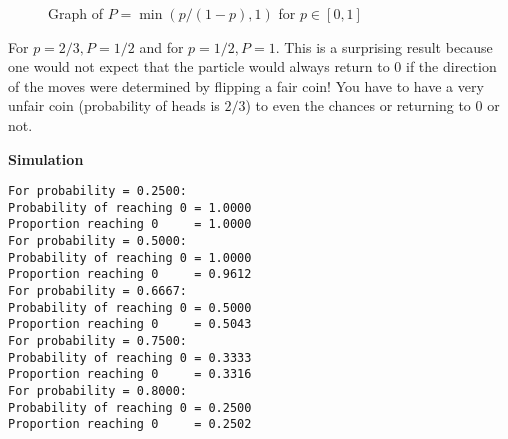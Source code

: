 \begin{figure}[tb]
\begin{center}
\end{center}
\caption{Graph of $P=\min(p/(1-p),1)$ for $p\in [0,1]$}\label{f.ruin2}
\end{figure}
For $p=2/3, P=1/2$ and for $p=1/2, P=1$. This is a surprising result because one would not expect that the particle would always return to $0$ if the direction of the moves were determined by flipping a fair coin! You have to have a very unfair coin (probability of heads is $2/3$) to even the chances or returning to $0$ or not.

\textbf{Simulation}
\begin{verbatim}
For probability = 0.2500:
Probability of reaching 0 = 1.0000
Proportion reaching 0     = 1.0000
For probability = 0.5000:
Probability of reaching 0 = 1.0000
Proportion reaching 0     = 0.9612
For probability = 0.6667:
Probability of reaching 0 = 0.5000
Proportion reaching 0     = 0.5043
For probability = 0.7500:
Probability of reaching 0 = 0.3333
Proportion reaching 0     = 0.3316
For probability = 0.8000:
Probability of reaching 0 = 0.2500
Proportion reaching 0     = 0.2502
\end{verbatim}


